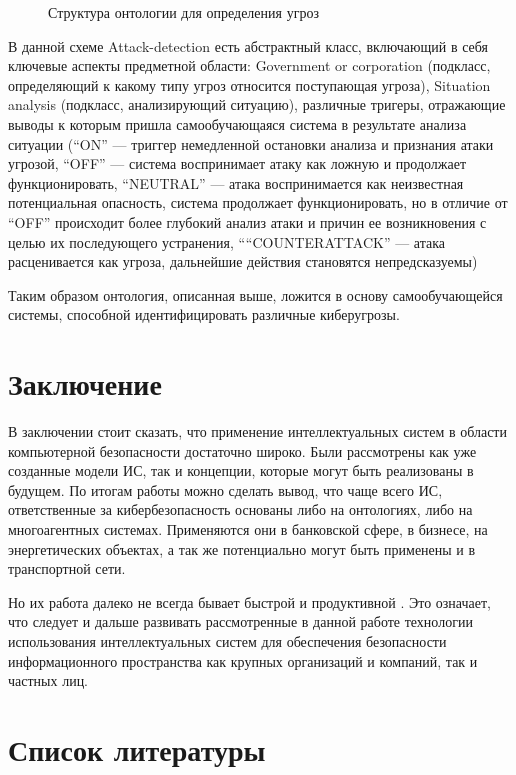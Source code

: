 \begin{figure}[h]
    \caption{Структура онтологии для определения угроз \cite{wars}}
    \label{ont}
\end{figure}

В данной схеме Attack-detection есть абстрактный класс, включающий в себя ключевые аспекты предметной
области: Government or corporation (подкласс, определяющий к какому типу угроз относится поступающая угроза),
Situation analysis (подкласс, анализирующий ситуацию), различные тригеры, отражающие выводы к которым пришла
самообучающаяся система в результате анализа ситуации (``ON'' --- триггер немедленной остановки анализа и
признания атаки угрозой, ``OFF'' --- система воспринимает атаку как ложную и продолжает функционировать,
``NEUTRAL'' --- атака воспринимается как неизвестная потенциальная опасность, система продолжает функционировать,
но в отличие от ``OFF'' происходит более глубокий анализ атаки и причин ее возникновения с целью их
последующего устранения, ``“COUNTERATTACK'' --- атака расценивается как угроза, дальнейшие действия становятся
непредсказуемы)

Таким образом онтология, описанная выше, ложится в основу самообучающейся системы, способной идентифицировать
различные киберугрозы.

\section{Заключение}
В заключении стоит сказать, что применение интеллектуальных систем в области компьютерной безопасности
достаточно широко. Были рассмотрены как уже созданные модели ИС, так и концепции, которые могут
быть реализованы в будущем. По итогам работы можно сделать вывод, что чаще всего ИС, ответственные за
кибербезопасность основаны либо на онтологиях, либо на многоагентных системах. Применяются они в банковской
сфере, в бизнесе, на энергетических объектах, а так же потенциально могут быть применены и в транспортной сети.

Но их работа далеко не всегда бывает быстрой и продуктивной \cite{mob, upg}. Это означает,
что следует и дальше развивать рассмотренные в данной работе технологии использования интеллектуальных
систем для обеспечения безопасности информационного пространства как крупных организаций и компаний, так
и частных лиц.
\newpage

\section{Список литературы}
\medskip

